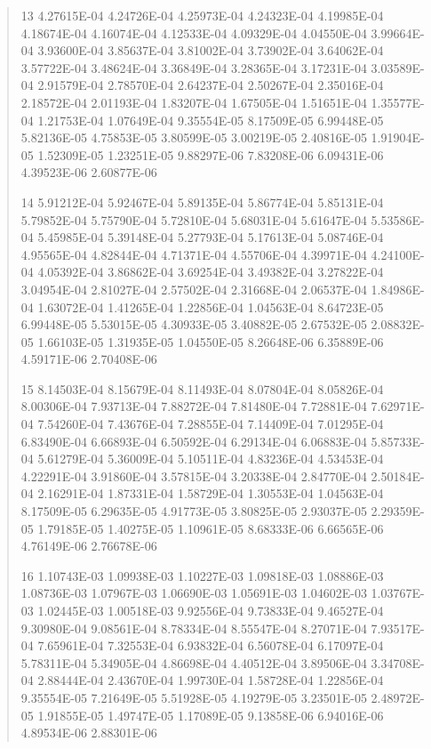 \documentclass[letterpaper,10pt,english]{sphinxmanual}
\begin{document}
\begin{quote}
\begin{DUlineblock}{0em}
\item[] 13   4.27615E-04  4.24726E-04  4.25973E-04  4.24323E-04  4.19985E-04  4.18674E-04  4.16074E-04  4.12533E-04  4.09329E-04  4.04550E-04  3.99664E-04  3.93600E-04  3.85637E-04  3.81002E-04  3.73902E-04  3.64062E-04  3.57722E-04  3.48624E-04  3.36849E-04  3.28365E-04  3.17231E-04  3.03589E-04  2.91579E-04  2.78570E-04  2.64237E-04  2.50267E-04  2.35016E-04  2.18572E-04  2.01193E-04  1.83207E-04  1.67505E-04  1.51651E-04  1.35577E-04  1.21753E-04  1.07649E-04  9.35554E-05  8.17509E-05  6.99448E-05  5.82136E-05  4.75853E-05  3.80599E-05  3.00219E-05  2.40816E-05  1.91904E-05  1.52309E-05  1.23251E-05  9.88297E-06  7.83208E-06  6.09431E-06  4.39523E-06  2.60877E-06
\item[] 14   5.91212E-04  5.92467E-04  5.89135E-04  5.86774E-04  5.85131E-04  5.79852E-04  5.75790E-04  5.72810E-04  5.68031E-04  5.61647E-04  5.53586E-04  5.45985E-04  5.39148E-04  5.27793E-04  5.17613E-04  5.08746E-04  4.95565E-04  4.82844E-04  4.71371E-04  4.55706E-04  4.39971E-04  4.24100E-04  4.05392E-04  3.86862E-04  3.69254E-04  3.49382E-04  3.27822E-04  3.04954E-04  2.81027E-04  2.57502E-04  2.31668E-04  2.06537E-04  1.84986E-04  1.63072E-04  1.41265E-04  1.22856E-04  1.04563E-04  8.64723E-05  6.99448E-05  5.53015E-05  4.30933E-05  3.40882E-05  2.67532E-05  2.08832E-05  1.66103E-05  1.31935E-05  1.04550E-05  8.26648E-06  6.35889E-06  4.59171E-06  2.70408E-06
\item[] 15   8.14503E-04  8.15679E-04  8.11493E-04  8.07804E-04  8.05826E-04  8.00306E-04  7.93713E-04  7.88272E-04  7.81480E-04  7.72881E-04  7.62971E-04  7.54260E-04  7.43676E-04  7.28855E-04  7.14409E-04  7.01295E-04  6.83490E-04  6.66893E-04  6.50592E-04  6.29134E-04  6.06883E-04  5.85733E-04  5.61279E-04  5.36009E-04  5.10511E-04  4.83236E-04  4.53453E-04  4.22291E-04  3.91860E-04  3.57815E-04  3.20338E-04  2.84770E-04  2.50184E-04  2.16291E-04  1.87331E-04  1.58729E-04  1.30553E-04  1.04563E-04  8.17509E-05  6.29635E-05  4.91773E-05  3.80825E-05  2.93037E-05  2.29359E-05  1.79185E-05  1.40275E-05  1.10961E-05  8.68333E-06  6.66565E-06  4.76149E-06  2.76678E-06
\item[] 16   1.10743E-03  1.09938E-03  1.10227E-03  1.09818E-03  1.08886E-03  1.08736E-03  1.07967E-03  1.06690E-03  1.05691E-03  1.04602E-03  1.03767E-03  1.02445E-03  1.00518E-03  9.92556E-04  9.73833E-04  9.46527E-04  9.30980E-04  9.08561E-04  8.78334E-04  8.55547E-04  8.27071E-04  7.93517E-04  7.65961E-04  7.32553E-04  6.93832E-04  6.56078E-04  6.17097E-04  5.78311E-04  5.34905E-04  4.86698E-04  4.40512E-04  3.89506E-04  3.34708E-04  2.88444E-04  2.43670E-04  1.99730E-04  1.58728E-04  1.22856E-04  9.35554E-05  7.21649E-05  5.51928E-05  4.19279E-05  3.23501E-05  2.48972E-05  1.91855E-05  1.49747E-05  1.17089E-05  9.13858E-06  6.94016E-06  4.89534E-06  2.88301E-06

\end{DUlineblock}
\end{quote}
\end{document}
